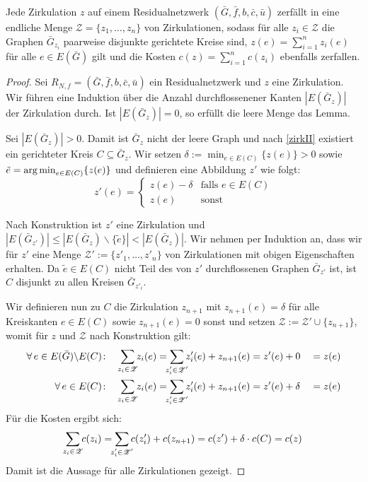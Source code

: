 \begin{lem}\label{zerl}Jede Zirkulation $z$ auf einem Residualnetzwerk $(\bar{G},\bar{f},b,\bar{c},\bar{u})$ zerfällt in eine endliche Menge $\mathscr{Z}=\{z_1,\ldots,z_n\}$ von Zirkulationen, sodass für alle $z_i\in\mathscr{Z}$ die Graphen $\bar{G}_{z_i}$ paarweise disjunkte gerichtete Kreise sind, $z(e)=\sum_{i=1}^{n} z_i(e)$ für alle $e\in E(\bar{G})$ gilt und die Kosten $c(z)=\sum_{i=1}^{n} c(z_i)$ ebenfalls zerfallen.\end{lem}
\begin{proof}Sei $R_{N,f}= (\bar{G},\bar{f},b,\bar{c},\bar{u})$ ein Residualnetzwerk und $z$ eine Zirkulation. Wir führen eine Induktion über die Anzahl durchflossenener Kanten $|E(\bar{G}_z)|$ der Zirkulation durch. Ist $|E(\bar{G}_z)|=0$, so erfüllt die leere Menge das Lemma.
    
Sei $|E(\bar{G}_z)|>0$. Damit ist $\bar{G}_z$ nicht der leere Graph und nach \cref{zirkII} existiert ein gerichteter Kreis $C\subseteq \bar{G}_z$. Wir setzen $\delta:=\min_{e\in E(C)} \{z(e)\}>0$ sowie $\tilde{e}=\operatorname*{arg\,min}_{e\in E(C)} \{z(e)\}$ und definieren eine Abbildung $z'$ wie folgt:
\begin{equation*}z'(e)=\begin{cases}
z(e)-\delta&\text{falls }e\in E(C)\\
z(e)&\text{sonst}\end{cases}
\end{equation*}

Nach Konstruktion ist $z'$ eine Zirkulation und $|E(\bar{G}_{z'})|\leq|E(\bar{G}_z)\backslash\{\tilde{e}\}|<|E(\bar{G}_z)|$. Wir nehmen per Induktion an, dass wir für $z'$ eine Menge $\mathscr{Z}':=\{z'_1,\ldots,z'_n\}$ von Zirkulationen mit obigen Eigenschaften erhalten. Da $\tilde{e}\in E(C)$ nicht Teil des von $z'$ durchflossenen Graphen $\bar{G}_{z'}$ ist, ist $C$ disjunkt zu allen Kreisen $\bar{G}_{z'_i}$.

Wir definieren nun zu $C$ die Zirkulation $z_{n+1}$ mit $z_{n+1}(e)=\delta$ für alle Kreiskanten $e\in E(C)$ sowie $z_{n+1}(e)=0$ sonst und setzen $\mathscr{Z}:=\mathscr{Z}'\cup \{z_{n+1}\}$, womit für $z$ und $\mathscr{Z}$ nach Konstruktion gilt:
\begin{alignat*}{2}
\forall\,e\in E(\bar{G})\backslash E(C)\colon\quad &\sum_{\mathclap{z_i\in\mathscr{Z}}} z_i(e) = \sum_{\mathclap{z'_i\in\mathscr{Z'}}} z'_i(e) + z_{n+1}(e)
=z'(e) + 0 &&= z (e)\\
%
\forall\,e\in E(C)\colon\quad &\sum_{\mathclap{z_i\in\mathscr{Z}}} z_i(e) = \sum_{\mathclap{z'_i\in\mathscr{Z'}}} z'_i(e) + z_{n+1}(e)
= z'(e) + \delta &&= z(e)
\end{alignat*}
Für die Kosten ergibt sich:
\begin{equation*}
\sum_{\mathclap{z_i\in\mathscr{Z}}} c(z_i) = \sum_{\mathclap{z'_i\in\mathscr{Z'}}} c(z'_i) + c(z_{n+1}) = c(z') + \delta\cdot c(C) = c(z)
\end{equation*}
Damit ist die Aussage für alle Zirkulationen gezeigt.\end{proof}


